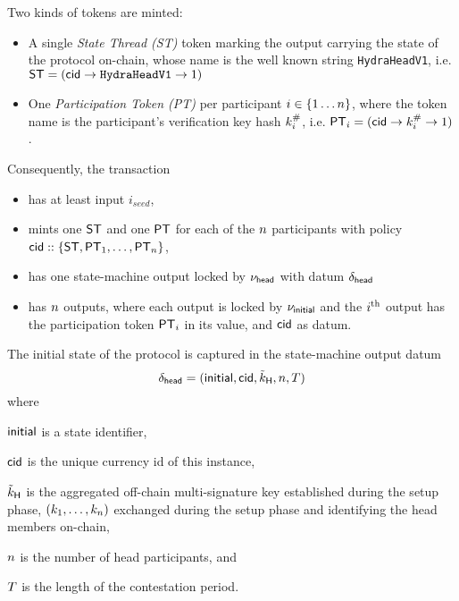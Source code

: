 \vspace{0.1cm}
\noindent Two kinds of tokens are minted:
\begin{itemize}
  \item A single \emph{State Thread (ST)} token marking the output carrying the state
        of the protocol on-chain, whose name is the well known string
        \texttt{HydraHeadV1}, i.e.
        $\mathsf{ST} = (\mathsf{cid} \rightarrow \texttt{HydraHeadV1} \rightarrow 1)$
  \item One \emph{Participation Token (PT)} per participant
        $i \in \{1 \dots n \}$, where the token name is the participant's
        verification key hash $k^{\#}_{i}$, i.e.
        $\mathsf{PT}_{i} = (\mathsf{cid} \rightarrow k^{\#}_{i} \rightarrow 1)$.
\end{itemize}

\noindent Consequently, the \mtxInit{} transaction

\begin{itemize}
  \item has at least input $i_{seed}$,
  \item mints one $\mathsf{ST}$ and one $\mathsf{PT}$ for each of the $n$ participants with
        policy $\mathsf{cid} :: \{\mathsf{ST}, \mathsf{PT}_{1}, \ldots, \mathsf{PT}_{n}\}$,
  \item has one state-machine output locked by $\nu_\mathsf{head}$ with datum
        $\delta_{\mathsf{head}}$
  \item has $n$ outputs, where each output is locked by $\nu_\mathsf{initial}$ and the
        $i^{\text{th}}$ output has the participation token $\mathsf{PT}_i$ in its value, and
        $\mathsf{cid}$ as datum.
\end{itemize}

\noindent The initial state of the protocol is captured in the state-machine output datum
\[
  \delta_{\mathsf{head}} = (\mathsf{initial},\mathsf{cid},\tilde{k}_{\mathsf{H}},n,T)
\]
where
\begin{mitemize}
  \item $\mathsf{initial}$ is a state identifier,
  \item $\mathsf{cid}$ is the unique currency id of this instance,
  \item $\tilde{k}_{\mathsf{H}}$ is the aggregated off-chain multi-signature key established during the
  setup phase,
  $(k_1,\ldots,k_n)$ exchanged during the setup phase and identifying the
  head members on-chain,
  \item $n$ is the number of head participants, and
  \item $T$ is the length of the contestation period.
\end{mitemize}

